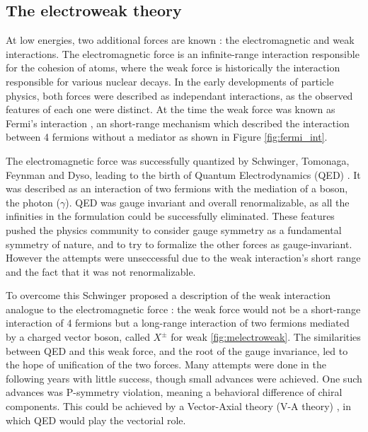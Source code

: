 \subsection{The electroweak theory}

At low energies, two additional forces are known : the electromagnetic and weak interactions. The electromagnetic force is an infinite-range interaction responsible for the cohesion of atoms, where the weak force is historically the interaction responsible for various nuclear decays. In the early developments of particle physics, both forces were described as independant interactions, as the observed features of each one were distinct. At the time the weak force was known as Fermi's interaction \cite{Fermi2008}, an short-range mechanism which described the interaction between 4 fermions without a mediator as shown in Figure \ref{fig:fermi_int}.

The electromagnetic force was successfully quantized by Schwinger, Tomonaga, Feynman and Dyso, leading to the birth of Quantum Electrodynamics (QED) \cite{PhysRev.80.440,PhysRev.76.749,PhysRev.76.769,PhysRev.74.1439,PhysRev.73.416,10.1143/PTP.1.27} . It was described as an interaction of two fermions with the mediation of a boson, the photon ($\gamma$). QED was gauge invariant and overall renormalizable, as all the infinities in the formulation could be successfully eliminated. These features pushed the physics community to consider gauge symmetry as a fundamental symmetry of nature, and to try to formalize the other forces as gauge-invariant. However the attempts were unseccessful due to the weak interaction's short range and the fact that it was not renormalizable.

To overcome this Schwinger proposed \cite{SCHWINGER1957407} a description of the weak interaction analogue to the electromagnetic force : the weak force would not be a short-range interaction of 4 fermions but a long-range interaction of two fermions mediated by a charged vector boson, called $X^{\pm}$ for weak \ref{fig:melectroweak}. The similarities between QED and this weak force, and the root of the gauge invariance, led to the hope of unification of the two forces. Many attempts were done in the following years with little success, though small advances were achieved. One such advances was P-symmetry violation, meaning a behavioral difference of chiral components. This could be achieved by a Vector-Axial theory (V-A theory) \cite{PhysRev.109.193,PhysRev.109.1860.2}, in which QED would play the vectorial role.

